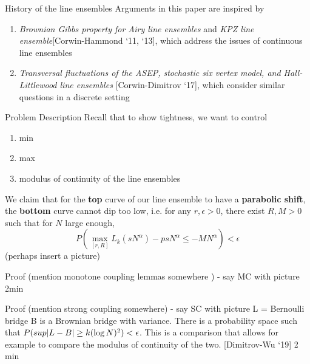 \documentclass[9pt,t,dvipsnames]{beamer}
\DeclarePairedDelimiter\abs{\lvert}{\rvert}
\begin{document}
\begin{frame} {History of the line ensembles}
	Arguments in this paper are inspired by 
	\begin{enumerate}
		\item \textit{Brownian Gibbs property for Airy line ensembles} and \textit{KPZ line ensemble}[Corwin-Hammond ‘11, ‘13], which address the issues of {\color{red}continuous} line ensembles
		\item \textit{Transversal fluctuations of the ASEP, stochastic six vertex model, and Hall-Littlewood line ensembles} [Corwin-Dimitrov ‘17], which consider similar questions in a {\color{red}discrete} setting 
	\end{enumerate}
\end{frame}
\begin{frame}{Problem Description}
	Recall that to show tightness, we want to control \begin{enumerate}
		\item \begin{center}
			min
		\end{center}
		\item 
		\begin{center}
			max
		\end{center}
		\item 
		\begin{center}
			modulus of continuity of the line ensembles
		\end{center}
	\end{enumerate}
	We claim that for the {\color{blue}\textbf{top}} curve of our line ensemble to have a {\color{red}\textbf{parabolic shift}}, the {\color{blue}\textbf{bottom}} curve cannot dip too low, i.e. for any $r, \epsilon > 0$, there exist $R, M > 0$ such that for $N$ large enough,
	$$P( \max_{[r, R]} L_k(sN^{\alpha}) - psN^{\alpha} \leq -MN^{\alpha} ) < \epsilon$$ 
	(perhaps insert a picture)
\end{frame}
\begin{frame}
Proof  (mention monotone coupling lemmas somewhere ) - say MC with picture
2min
\end{frame}

\begin{frame}
Proof  (mention strong coupling somewhere) - say SC with picture 
L = Bernoulli bridge B is a Brownian bridge with variance. There is a probability space such that $P( sup \abs*{L - B} \geq k (\log N)^2) < \epsilon$. This is a comparison that allows for example to compare the modulus of continuity of the two. [Dimitrov-Wu ‘19]
2 min
\end{frame}
\end{document}
